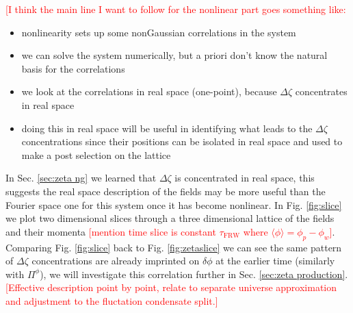 

\textcolor{red}{[I think the main line I want to follow for the nonlinear part goes something like:}
  \begin{itemize}
    \color{red}
    \item nonlinearity sets up some nonGaussian correlations in the system
    \item we can solve the system numerically, but a priori don't know the natural basis for the correlations
    \item we look at the correlations in real space (one-point), because $\Delta\zeta$ concentrates in real space
    \item doing this in real space will be useful in identifying what leads to the $\Delta\zeta$ concentrations since their positions can be isolated in real space and used to make a post selection on the lattice
  \end{itemize}
      
In Sec. \ref{sec:zeta ng} we learned that $\Delta\zeta$ is concentrated in real space, this suggests the real space description of the fields may be more useful than the Fourier space one for this system once it has become nonlinear. In Fig. \ref{fig:slice} we plot two dimensional slices through a three dimensional lattice of the fields and their momenta \textcolor{red}{[mention time slice is constant $\tau_\mathrm{FRW}$ where $\langle\phi\rangle=\phi_p-\phi_w$]}. Comparing Fig. \ref{fig:slice} back to Fig. \ref{fig:zetaslice} we can see the same pattern of $\Delta\zeta$ concentrations are already imprinted on $\delta\phi$ at the earlier time (similarly with $\Pi^\phi$), we will investigate this correlation further in Sec. \ref{sec:zeta production}.
\textcolor{red}{[Effective description point by point, relate to separate universe approximation and adjustment to the fluctation condensate split.]}

\Fslice


